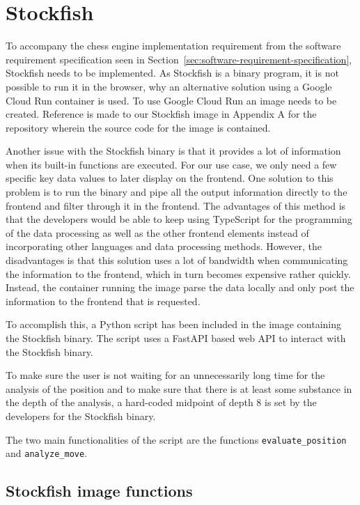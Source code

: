 \section{Stockfish}\label{sec:stockfish}

To accompany the chess engine implementation requirement from the software requirement specification seen in
Section~\ref{sec:software-requirement-specification}, Stockfish needs to be implemented.
As Stockfish is a binary program, it is not possible to run it in the browser, why an alternative solution using a
Google Cloud Run container is used.
To use Google Cloud Run an image needs to be created.
Reference is made to our Stockfish image in Appendix A for the repository wherein the source code for the image is
contained.

Another issue with the Stockfish binary is that it provides a lot of information when its built-in functions are
executed.
For our use case, we only need a few specific key data values to later display on the frontend.
One solution to this problem is to run the binary and pipe all the output information directly to the frontend and
filter through it in the frontend.
The advantages of this method is that the developers would be able to keep using TypeScript for the programming of the
data processing as well as the other frontend elements instead of incorporating other languages and data processing
methods.
However, the disadvantages is that this solution uses a lot of bandwidth when communicating the information to the
frontend, which in turn becomes expensive rather quickly.
Instead, the container running the image parse the data locally and only post the information to the frontend that is
requested.

To accomplish this, a Python script has been included in the image containing the Stockfish binary.
The script uses a FastAPI based web API to interact with the Stockfish binary.

To make sure the user is not waiting for an unnecessarily long time for the analysis of the position and to make sure
that there is at least some substance in the depth of the analysis, a hard-coded midpoint of depth 8 is set by the
developers for the Stockfish binary.

The two main functionalities of the script are the functions \texttt{evaluate\_position} and \texttt{analyze\_move}.

\subsection{Stockfish image functions}\label{subsec:stockfish-image-functions}

